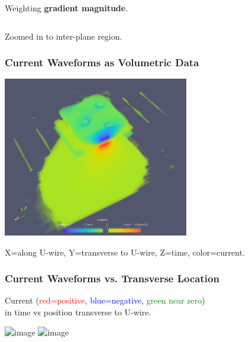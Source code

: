 \documentclass[xcolor=dvipsnames]{beamer}
\begin{document}
\begin{frame}
\begin{columns}
\begin{column}{0.5\textwidth}
\begin{center}
        Weighting \textbf{gradient magnitude}.
      \end{center}      
    \end{column}
  \end{columns}
  \begin{center}
    Zoomed in to inter-plane region.
  \end{center}
\end{frame}


\begin{frame}
  \frametitle{Current Waveforms as Volumetric Data}
  \begin{center}
    \includegraphics[height=7cm,clip,trim=0cm 0cm 0cm 0cm]{current-iso.png}

    \footnotesize
    X=along U-wire, Y=transverse to U-wire, Z=time, color=current.
  \end{center}

\end{frame}

\begin{frame}
  \frametitle{Current Waveforms vs. Transverse Location}
  \begin{center}
    Current (\textcolor{red}{red=positive}, \textcolor{blue}{blue=negative}, \textcolor{green}{green near zero}) \\
    in time vs position transverse to U-wire.

    \includegraphics<1>[height=5cm,clip,trim=0cm 8cm 0cm 8cm]{current-slice.png}
    \includegraphics<2>[height=5cm,clip,trim=0cm 8cm 0cm 8cm]{current-3d.png}
    
  \end{center}
  
\end{frame}
\end{document}
